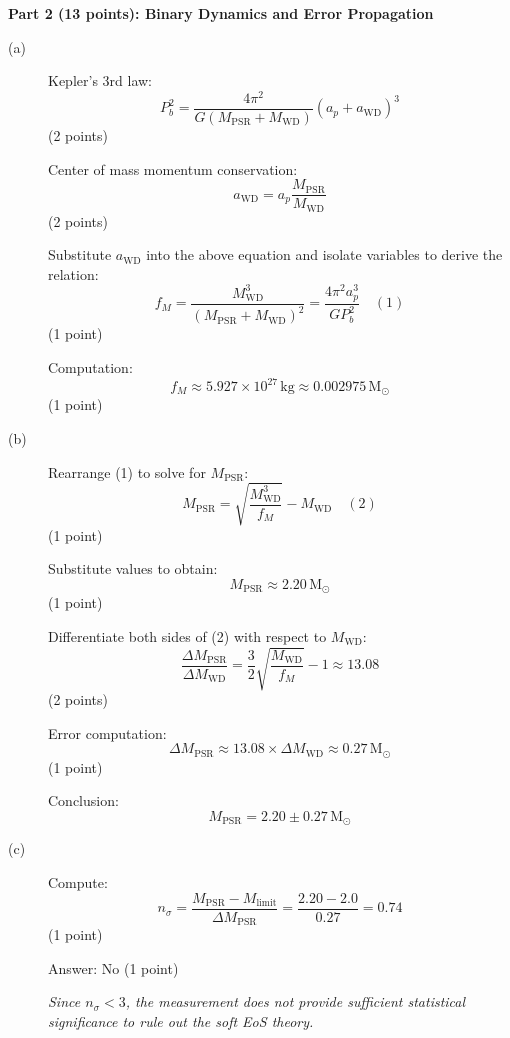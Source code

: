 \medskip\noindent\textbf{Part 2 (13 points): Binary Dynamics and Error Propagation}

\begin{description}
\item[(a)] Kepler's 3rd law:
  \[
  P_b^2 = \frac{4\pi^2}{G\left(M_{\mathrm{PSR}} + M_{\mathrm{WD}}\right)}
    \left(a_p + a_{\mathrm{WD}}\right)^3
  \]
  \hfill(2 points)

  Center of mass momentum conservation:
  \[
  a_{\mathrm{WD}} = a_p\frac{M_{\mathrm{PSR}}}{M_{\mathrm{WD}}}
  \]
  \hfill(2 points)

  Substitute $a_{\mathrm{WD}}$ into the above equation and isolate variables
  to derive the relation:
  \[
  f_M = \frac{M_{\mathrm{WD}}^3}{\left(M_{\mathrm{PSR}} + M_{\mathrm{WD}}\right)^2}
      = \frac{4\pi^2 a_p^3}{G P_b^2} \quad (1)
  \]
  \hfill(1 point)

  Computation:
  \[
  f_M \approx 5.927 \times 10^{27}\,\mathrm{kg} \approx 0.002975\,\mathrm{M}_\odot
  \]
  \hfill(1 point)

\item[(b)] Rearrange (1) to solve for $M_{\mathrm{PSR}}$:
  \[
  M_{\mathrm{PSR}} = \sqrt{\frac{M_{\mathrm{WD}}^3}{f_M}} - M_{\mathrm{WD}}
  \quad (2)
  \]
  \hfill(1 point)

  Substitute values to obtain:
  \[
  M_{\mathrm{PSR}} \approx 2.20\,\mathrm{M}_\odot
  \]
  \hfill(1 point)

  Differentiate both sides of (2) with respect to $M_{\mathrm{WD}}$:
  \[
  \frac{\Delta M_{\mathrm{PSR}}}{\Delta M_{\mathrm{WD}}}
    = \frac{3}{2}\sqrt{\frac{M_{\mathrm{WD}}}{f_M}} - 1 \approx 13.08
  \]
  \hfill(2 points)

  Error computation:
  \[
  \Delta M_{\mathrm{PSR}} \approx 13.08 \times \Delta M_{\mathrm{WD}}
    \approx 0.27\,\mathrm{M}_\odot
  \]
  \hfill(1 point)

  Conclusion:
  \[
  M_{\mathrm{PSR}} = 2.20 \pm 0.27\,\mathrm{M}_\odot
  \]

\item[(c)] Compute:
  \[
  n_\sigma = \frac{M_{\mathrm{PSR}} - M_{\mathrm{limit}}}{\Delta M_{\mathrm{PSR}}}
    = \frac{2.20 - 2.0}{0.27} = 0.74
  \]
  \hfill(1 point)

  Answer: No \hfill(1 point)

  \emph{Since $n_\sigma < 3$, the measurement does not provide sufficient
  statistical significance to rule out the soft EoS theory.}
\end{description}

